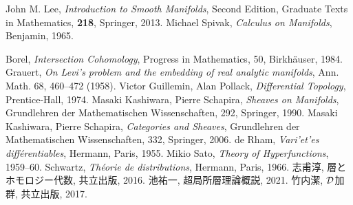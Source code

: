 \begin{thebibliography}{20} 
     John M. Lee, 
    \textit{Introduction to Smooth Manifolds}, Second Edition,
    Graduate Texts in Mathematics, \textbf{218}, Springer, 2013.
     Michael Spivak, 
    \textit{Calculus on Manifolds}, 
    Benjamin, 1965.

     Borel, 
    \textit{Intersection Cohomology}, 
    Progress in Mathematics, 50, Birkh\"auser, 1984.
 Grauert, 
    \textit{On Levi's problem and the embedding of real analytic manifolds}, 
    Ann. Math. 68, 460--472 (1958).
 Victor Guillemin, Alan Pollack, 
    \textit{Differential Topology}, 
    Prentice-Hall, 1974.
 Masaki Kashiwara, Pierre Schapira, 
    \textit{Sheaves on Manifolds}, 
    Grundlehren der Mathematischen Wissenschaften, 292, Springer, 1990.
 Masaki Kashiwara, Pierre Schapira, 
    \textit{Categories and Sheaves}, 
    Grundlehren der Mathematischen Wissenschaften, 332, Springer, 2006.
 de Rham, 
    \textit{Vari'et'es diff\'erentiables}, 
    Hermann, Paris, 1955.
 Mikio Sato, 
    \textit{Theory of Hyperfunctions}, 
    1959--60.
 Schwartz, 
    \textit{Th\'eorie de distributions}, 
    Hermann, Paris, 1966.
 志甫淳, 層とホモロジー代数, 共立出版, 2016.
 池祐一, 超局所層理論概説, 2021.
 竹内潔, \(\mathcal{D}\)加群, 共立出版, 2017.

\end{thebibliography}




